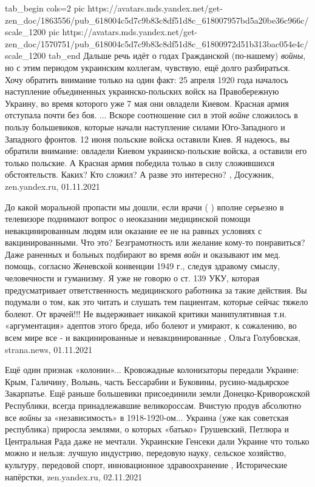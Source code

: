 \ifcmt
  tab_begin cols=2
     pic https://avatars.mds.yandex.net/get-zen_doc/1863556/pub_618004c5d7c9b83c8df51d8c_618007957bd5a20be36c966c/scale_1200
     pic https://avatars.mds.yandex.net/get-zen_doc/1570751/pub_618004c5d7c9b83c8df51d8c_61800972d51b313bac054e4c/scale_1200
  tab_end
\fi
Дальше речь идёт о годах Гражданской (по-нашему) \emph{войны}, но с этим периодом
украинским коллегам, чувствую, ещё долго разбираться. Хочу обратить внимание
только на один факт: 25 апреля 1920 года началось наступление объединенных
украинско-польских войск на Правобережную Украину, во время которого уже 7 мая
они овладели Киевом.  Красная армия отступала почти без боя. ... Вскоре
соотношение сил в этой \emph{войне} сложилось в пользу большевиков, которые начали
наступление силами Юго-Западного и Западного фронтов. 12 июня польские войска
оставили Киев.  Я надеюсь, вы обратили внимание: овладели Киевом
украинско-польские войска, а оставили его только польские. А Красная армия
победила только в силу сложившихся обстоятельств. Каких? Кто сложил? А разве
это интересно?
, 
Досужник, zen.yandex.ru, 01.11.2021

До какой моральной пропасти мы дошли, если врачи ( ) вполне серьезно в
телевизоре поднимают вопрос о неоказании медицинской помощи невакцинированным
людям или оказание ее не на равных условиях с вакцинированными. Что это?
Безграмотность или желание кому-то понравиться?  Даже раненных и больных
подбирают во время \emph{войн} и оказывают им мед. помощь, согласно Женевской
конвенции 1949 г., следуя здравому смыслу, человечности и гуманизму. Я уже не
говорю о ст. 139 УКУ, которая предусматривает ответственность медицинского
работника за такие действия. Вы подумали о том, как это читать и слушать тем
пациентам, которые сейчас тяжело болеют. От врачей!!!  Не выдерживает никакой
критики манипулятивная т.н. «аргументация» адептов этого бреда, ибо болеют и
умирают, к сожалению, во всем мире все - и вакцинированные и невакцинированные
, 
Ольга Голубовская, strana.news, 01.11.2021

Ещё один признак «колонии»... Кровожадные колонизаторы передали Украине: Крым,
Галичину, Волынь, часть Бессарабии и Буковины, русино-мадьярское Закарпатье.
Ещё раньше большевики присоединили земли Донецко-Криворожской Республики,
всегда принадлежавшие великороссам. Вчистую продув абсолютно все \emph{войны} за
«независимость» в 1918-1920-ом... Украина (уже как советская республика)
приросла землями, о которых «батько» Грушевский, Петлюра и Центральная Рада
даже не мечтали.  Украинские Генсеки дали Украине что только можно и нельзя:
лучшую индустрию, передовую науку, сельское хозяйство, культуру, передовой
спорт, инновационное здравоохранение
, 
Исторические напёрстки, zen.yandex.ru, 02.11.2021

